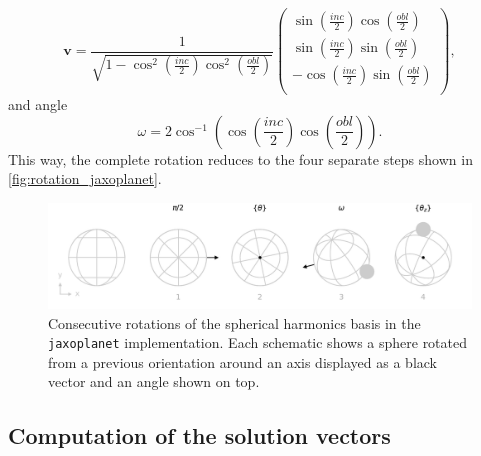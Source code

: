 \documentclass[modern]{aastex631}
\begin{document}
\begin{equation}
    \bm{v} = \frac{1}{\sqrt{1 - \cos^2{\left(\frac{inc}{2} \right)} \cos^2{\left(\frac{obl}{2}\right)}}} \begin{pmatrix}
        \sin{\left(\frac{inc}{2} \right)} \cos{\left(\frac{obl}{2}\right)}\\
        \sin{\left(\frac{inc}{2} \right)} \sin{\left(\frac{obl}{2}\right)}\\
         - \cos{\left(\frac{inc}{2} \right)} \sin{\left(\frac{obl}{2}\right)}\\
    \end{pmatrix},
\end{equation}
and angle
\begin{equation}
    \omega = 2 \cos^{-1}{\left(\cos{\left(\frac{inc}{2} \right)} \cos{\left(\frac{obl}{2}\right)} \right)}.
\end{equation}
This way, the complete rotation reduces to the four separate steps shown in \autoref{fig:rotation_jaxoplanet}.
\begin{figure}[H]
    \begin{center}
        \includegraphics[width=\textwidth]{../workflows/rotations/figures/rotation_jaxoplanet_1.pdf}
        \caption{Consecutive rotations of the spherical harmonics basis in the \texttt{jaxoplanet} implementation. Each schematic shows a sphere rotated from a previous orientation around an axis displayed as a black vector and an angle shown on top.}
        \label{fig:rotation_jaxoplanet}
    \end{center}
\end{figure}

\subsection{Computation of the solution vectors}\label{solution_vectors}

\newpage
\end{document}
